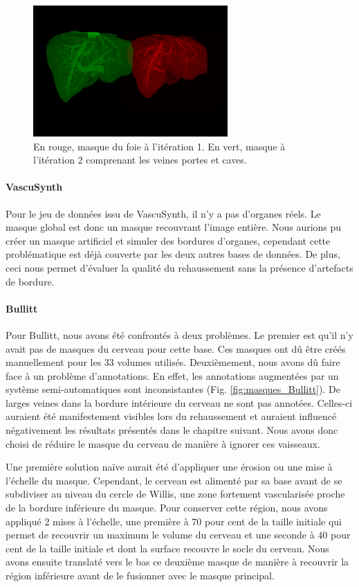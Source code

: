 \begin{figure}[!ht]
  \centering
  \includegraphics[height=5cm]{Images/ircad_corrected_gt.png}
  \caption{En rouge, masque du foie à l'itération 1. En vert, masque à l'itération 2 comprenant les veines portes et caves.}
  \label{fig:masques_globaux_ircad}
\end{figure}

\paragraph{VascuSynth}
Pour le jeu de données issu de VascuSynth, il n'y a pas d'organes réels. Le masque global est donc un masque recouvrant l'image entière. Nous aurions pu créer un masque artificiel et simuler des bordures d'organes, cependant cette problématique est déjà couverte par les deux autres bases de données. De plus, ceci nous permet d'évaluer la qualité du rehaussement sans la présence d'artefacts de bordure.

\paragraph{Bullitt}
Pour Bullitt, nous avons été confrontés à deux problèmes. Le premier est qu'il n'y avait pas de masques du cerveau pour cette base. Ces masques ont dû être créés manuellement pour les 33 volumes utilisés. Deuxièmement, nous avons dû faire face à un problème d'annotations. En effet, les annotations augmentées par un système semi-automatiques sont inconsistantes (Fig. \ref{fig:masques_Bullitt}). De larges veines dans la bordure intérieure du cerveau ne sont pas annotées. Celles-ci auraient été manifestement visibles lors du rehaussement et auraient influencé négativement les résultats présentés dans le chapitre suivant. Nous avons donc choisi de réduire le masque du cerveau de manière à ignorer ces vaisseaux.

Une première solution naïve aurait été d'appliquer une érosion ou une mise à l'échelle du masque. Cependant, le cerveau est alimenté par sa base avant de se subdiviser au niveau du cercle de Willis, une zone fortement vascularisée proche de la bordure inférieure du masque. Pour conserver cette région, nous avons appliqué 2 mises à l'échelle, une première à $70$ pour cent de la taille initiale qui permet de recouvrir un maximum le volume du cerveau et une seconde à $40$ pour cent de la taille initiale et dont la surface recouvre le socle du cerveau. Nous avons ensuite translaté vers le bas ce deuxième masque de manière à recouvrir la région inférieure avant de le fusionner avec le masque principal.


